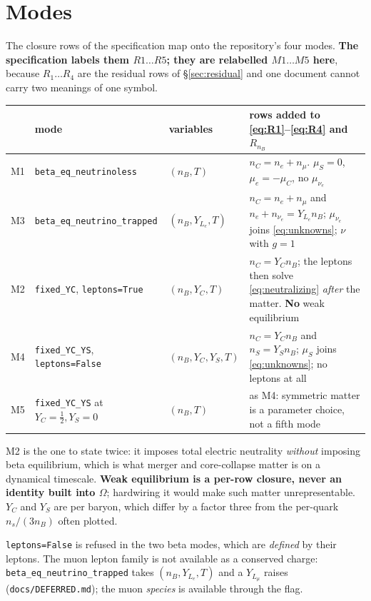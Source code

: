 \documentclass[11pt,a4paper]{article}
\newcommand{\code}[1]{\texttt{#1}}
\begin{document}
\section{Modes}
\label{sec:modes}

The closure rows of the specification map onto the repository's four modes.
\textbf{The specification labels them $R1\ldots R5$; they are relabelled
$M1\ldots M5$ here}, because $R_1\ldots R_4$ are the residual rows of
\S\ref{sec:residual} and one document cannot carry two meanings of one symbol.

\begin{table}[h]
\centering
\begin{tabular}{lllp{5.6cm}}
\toprule
 & mode & variables & rows added to \eqref{eq:R1}--\eqref{eq:R4} and $R_{n_B}$ \\
\midrule
M1 & \code{beta\_eq\_neutrinoless} & $(n_B,T)$ &
 $n_C=n_e+n_\mu$. $\mu_S=0$, $\mu_e=-\mu_C$, no $\mu_{\nu_e}$ \\
M3 & \code{beta\_eq\_neutrino\_trapped} & $(n_B,Y_{L_e},T)$ &
 $n_C=n_e+n_\mu$ and $n_e+n_{\nu_e}=Y_{L_e}n_B$; $\mu_{\nu_e}$ joins
 \eqref{eq:unknowns}; $\nu$ with $g=1$ \\
M2 & \code{fixed\_YC}, \code{leptons=True} & $(n_B,Y_C,T)$ &
 $n_C=Y_Cn_B$; the leptons then solve \eqref{eq:neutralizing} \emph{after}
 the matter. \textbf{No} weak equilibrium \\
M4 & \code{fixed\_YC\_YS}, \code{leptons=False} & $(n_B,Y_C,Y_S,T)$ &
 $n_C=Y_Cn_B$ and $n_S=Y_Sn_B$; $\mu_S$ joins \eqref{eq:unknowns}; no leptons
 at all \\
M5 & \code{fixed\_YC\_YS} at $Y_C=\tfrac12,Y_S=0$ & $(n_B,T)$ &
 as M4: symmetric matter is a parameter choice, not a fifth mode \\
\bottomrule
\end{tabular}
\end{table}

M2 is the one to state twice: it imposes total electric neutrality
\emph{without} imposing beta equilibrium, which is what merger and
core-collapse matter is on a dynamical timescale. \textbf{Weak equilibrium is a
per-row closure, never an identity built into $\Omega$}; hardwiring it would
make such matter unrepresentable. $Y_C$ and $Y_S$ are per baryon, which differ
by a factor three from the per-quark $n_s/(3n_B)$ often plotted.

\code{leptons=False} is refused in the two beta modes, which are \emph{defined}
by their leptons. The muon lepton family is not available as a conserved
charge: \code{beta\_eq\_neutrino\_trapped} takes $(n_B,Y_{L_e},T)$ and a
$Y_{L_\mu}$ raises (\code{docs/DEFERRED.md}); the muon \emph{species} is
available through the flag.
\end{document}
